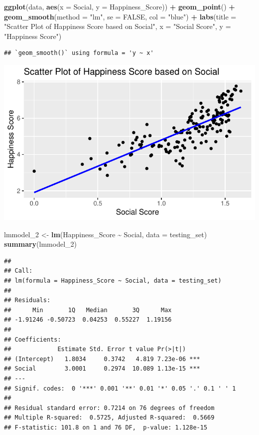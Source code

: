 \documentclass[
  11pt,
]{article}
\newenvironment{Shaded}{\begin{snugshade}}{\end{snugshade}}
\newcommand{\AttributeTok}[1]{\textcolor[rgb]{0.13,0.29,0.53}{#1}}
\newcommand{\ConstantTok}[1]{\textcolor[rgb]{0.56,0.35,0.01}{#1}}
\newcommand{\FunctionTok}[1]{\textcolor[rgb]{0.13,0.29,0.53}{\textbf{#1}}}
\newcommand{\NormalTok}[1]{#1}
\newcommand{\OtherTok}[1]{\textcolor[rgb]{0.56,0.35,0.01}{#1}}
\newcommand{\SpecialCharTok}[1]{\textcolor[rgb]{0.81,0.36,0.00}{\textbf{#1}}}
\newcommand{\StringTok}[1]{\textcolor[rgb]{0.31,0.60,0.02}{#1}}
\begin{document}
\begin{Shaded}
\begin{Highlighting}[]
\FunctionTok{ggplot}\NormalTok{(data, }\FunctionTok{aes}\NormalTok{(}\AttributeTok{x =}\NormalTok{ Social, }\AttributeTok{y =}\NormalTok{ Happiness\_Score)) }\SpecialCharTok{+}
  \FunctionTok{geom\_point}\NormalTok{() }\SpecialCharTok{+}
  \FunctionTok{geom\_smooth}\NormalTok{(}\AttributeTok{method =} \StringTok{"lm"}\NormalTok{, }\AttributeTok{se =} \ConstantTok{FALSE}\NormalTok{, }\AttributeTok{col =} \StringTok{"blue"}\NormalTok{) }\SpecialCharTok{+}
  \FunctionTok{labs}\NormalTok{(}\AttributeTok{title =} \StringTok{"Scatter Plot of Happiness Score based on Social"}\NormalTok{, }
       \AttributeTok{x =} \StringTok{"Social Score"}\NormalTok{, }
       \AttributeTok{y =} \StringTok{"Happiness Score"}\NormalTok{)}
\end{Highlighting}
\end{Shaded}

\begin{verbatim}
## `geom_smooth()` using formula = 'y ~ x'
\end{verbatim}

\begin{center}\includegraphics[width=0.7\linewidth]{Group_project_2_files/figure-latex/unnamed-chunk-48-1} \end{center}

\begin{Shaded}
\begin{Highlighting}[]
\NormalTok{lmmodel\_2 }\OtherTok{\textless{}{-}} \FunctionTok{lm}\NormalTok{(Happiness\_Score }\SpecialCharTok{\textasciitilde{}}\NormalTok{ Social, }\AttributeTok{data =}\NormalTok{ testing\_set)}
\FunctionTok{summary}\NormalTok{(lmmodel\_2)}
\end{Highlighting}
\end{Shaded}

\begin{verbatim}
## 
## Call:
## lm(formula = Happiness_Score ~ Social, data = testing_set)
## 
## Residuals:
##      Min       1Q   Median       3Q      Max 
## -1.91246 -0.50723  0.04253  0.55227  1.19156 
## 
## Coefficients:
##             Estimate Std. Error t value Pr(>|t|)    
## (Intercept)   1.8034     0.3742   4.819 7.23e-06 ***
## Social        3.0001     0.2974  10.089 1.13e-15 ***
## ---
## Signif. codes:  0 '***' 0.001 '**' 0.01 '*' 0.05 '.' 0.1 ' ' 1
## 
## Residual standard error: 0.7214 on 76 degrees of freedom
## Multiple R-squared:  0.5725, Adjusted R-squared:  0.5669 
## F-statistic: 101.8 on 1 and 76 DF,  p-value: 1.128e-15
\end{verbatim}
\end{document}
